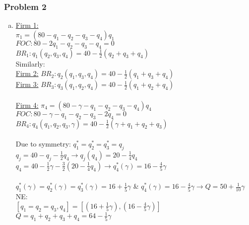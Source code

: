 \documentclass[a4paper]{article}
\begin{document}
\subsubsection{Problem 2}\label{problem2}
\begin{enumerate}[(a)]
\item
\underline{Firm 1:} \\$\pi_1=(80-q_1-q_2-q_3-q_4)q_1$\\
$FOC : 80-2q_1-q_2-q_3-q_4=0$\\
$BR_1: q_1(q_2,q_3,q_4)=40-\frac{1}{2}(q_2+q_3+q_4)$\\
Similarly:\\
\underline{Firm 2:}
$BR_2: q_2(q_1,q_3,q_4)=40-\frac{1}{2}(q_1+q_3+q_4)$\\
\underline{Firm 3:}
$BR_3: q_3(q_1,q_2,q_4)=40-\frac{1}{2}(q_1+q_2+q_4)$\\
\\
\underline{Firm 4:}
$\pi_4=(80-\gamma-q_1-q_2-q_3-q_4)q_4$\\
$FOC: 80-\gamma-q_1-q_2-q_3-2q_4=0$\\
$BR_4: q_4(q_1,q_2,q_3,\gamma)=40-\frac{1}{2}(\gamma+q_1+q_2+q_3)$\\
\\
Due to symmetry: $q_1^*=q_2^*=q_3^*=q_j$\\
$q_j=40-q_j-\frac{1}{2}q_4 \rightarrow q_j(q_4)=20-\frac{1}{4}q_4$\\
$q_4=40-\frac{1}{2}\gamma-\frac{3}{2}(20-\frac{1}{4}q_4) \rightarrow q_4^*(\gamma)=16-\frac{4}{5}\gamma$
\\
\\
$q_1^*(\gamma)=q_2^*(\gamma)=q_3^*(\gamma)=16+\frac{1}{5}\gamma$ \& $q_4^*(\gamma)=16-\frac{4}{5}\gamma\rightarrow Q=50+\frac{1}{10}\gamma$\\

NE:\\ $[q_1=q_2=q_3,q_4]=[(16+\frac{1}{5}\gamma), (16-\frac{4}{5}\gamma)]$\\

$Q=q_1+q_2+q_3+q_4=64-\frac{1}{5}\gamma$\\


\end{enumerate}
\end{document}
